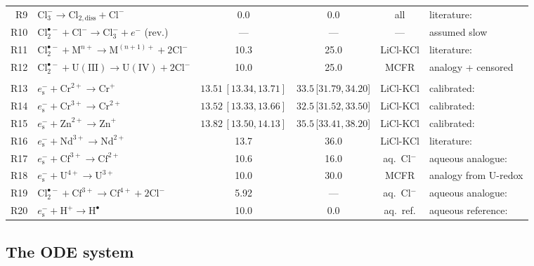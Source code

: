 \documentclass[11pt]{article}
\theoremstyle{plain}
\theoremstyle{definition}
\theoremstyle{remark}
\newcommand{\eS}{\ensuremath{e_{\mathrm{s}}^{-}}\xspace}
\newcommand{\Clt}{\ensuremath{\mathrm{Cl}_2^{\bullet-}}\xspace}
\begin{document}
\begin{table}[h!]
{\begin{tabular}{rlcccl}
R9  & $\mathrm{Cl}_3^- \to \mathrm{Cl}_{2,\mathrm{diss}} + \mathrm{Cl}^-$ & 0.0 & 0.0 & all      & literature: \citep{Hagiwara1987} \\
R10 & $\Clt + \mathrm{Cl}^- \to \mathrm{Cl}_3^- + e^-$ (rev.)              & ---  & ---  & --- & assumed slow         \\
R11 & $\Clt + \mathrm{M}^{n+} \to \mathrm{M}^{(n+1)+} + 2\mathrm{Cl}^-$    & 10.3 & 25.0 & LiCl-KCl & literature: \citep{Iwamatsu2022} \\
R12 & $\Clt + \mathrm{U}(\mathrm{III}) \to \mathrm{U}(\mathrm{IV}) + 2\mathrm{Cl}^-$ & 10.0 & 25.0 & MCFR     & analogy + censored \\
\addlinespace
\multicolumn{6}{l}{\itshape Metal redox} \\
R13 & $\eS + \mathrm{Cr}^{2+} \to \mathrm{Cr}^+$                 & $13.51\,[13.34, 13.71]$ & $33.5$\,[$31.79, 34.20$] & LiCl-KCl & calibrated: \citep{Iwamatsu2026} \\
R14 & $\eS + \mathrm{Cr}^{3+} \to \mathrm{Cr}^{2+}$              & $13.52\,[13.33, 13.66]$ & $32.5$\,[$31.52, 33.50$] & LiCl-KCl & calibrated: \citep{Iwamatsu2026} \\
R15 & $\eS + \mathrm{Zn}^{2+} \to \mathrm{Zn}^+$                 & $13.82\,[13.50, 14.13]$ & $35.5$\,[$33.41, 38.20$] & LiCl-KCl & calibrated: \citep{Iwamatsu2022,Iwamatsu2026} \\
R16 & $\eS + \mathrm{Nd}^{3+} \to \mathrm{Nd}^{2+}$              & 13.7 & 36.0 & LiCl-KCl & literature: \citep{CastroBaldivieso2026} \\
R17 & $\eS + \mathrm{Cf}^{3+} \to \mathrm{Cf}^{2+}$              & 10.6 & 16.0 & aq.\ Cl$^-$ & aqueous analogue: \citep{Rotermund2024} \\
R18 & $\eS + \mathrm{U}^{4+} \to \mathrm{U}^{3+}$                & 10.0 & 30.0 & MCFR     & analogy from U-redox \\
R19 & $\Clt + \mathrm{Cf}^{3+} \to \mathrm{Cf}^{4+} + 2\mathrm{Cl}^-$ & 5.92 & --- & aq.\ Cl$^-$ & aqueous analogue: \citep{Rotermund2024} \\
R20 & $\eS + \mathrm{H}^+ \to \mathrm{H}^{\bullet}$              & 10.0 & 0.0 & aq.\ ref. & aqueous reference: \citep{Rotermund2024} \\
\bottomrule
\end{tabular}}
\end{table}

\subsection{The ODE system}\label{sec:cl:ode}
\end{document}
